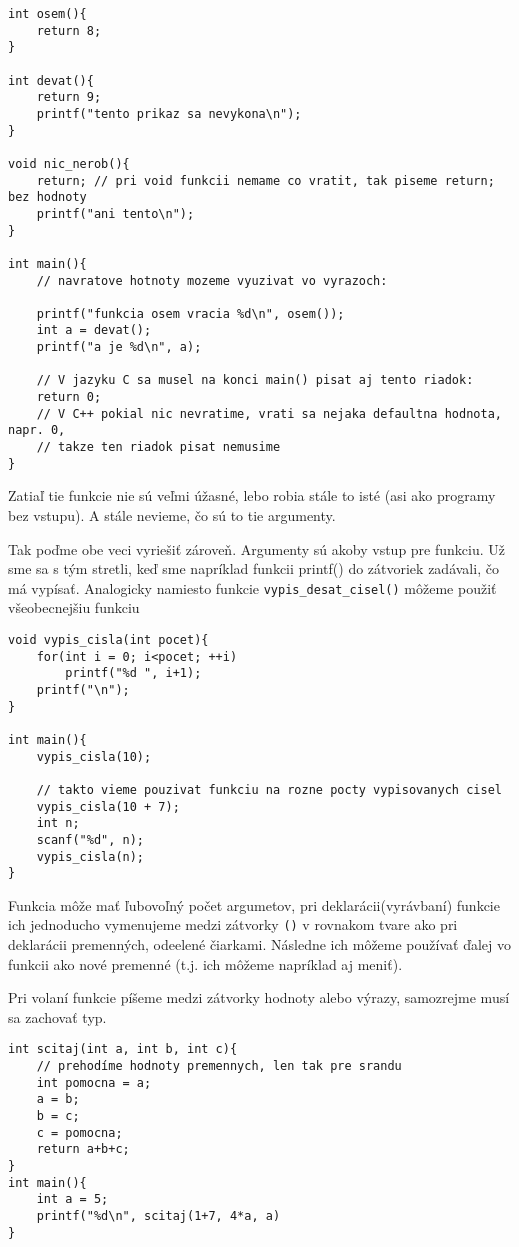 \begin{lstlisting}
int osem(){
    return 8;
}

int devat(){
    return 9;
    printf("tento prikaz sa nevykona\n");
}

void nic_nerob(){
    return; // pri void funkcii nemame co vratit, tak piseme return; bez hodnoty
    printf("ani tento\n");
}

int main(){
    // navratove hotnoty mozeme vyuzivat vo vyrazoch:

    printf("funkcia osem vracia %d\n", osem());
    int a = devat();
    printf("a je %d\n", a);

    // V jazyku C sa musel na konci main() pisat aj tento riadok:
    return 0;
    // V C++ pokial nic nevratime, vrati sa nejaka defaultna hodnota, napr. 0,
    // takze ten riadok pisat nemusime
}   
\end{lstlisting}

\medskip
    
Zatiaľ tie funkcie nie sú veľmi úžasné, lebo robia stále to isté (asi ako
programy bez vstupu).  A stále nevieme, čo sú to tie argumenty.

Tak poďme obe veci vyriešiť zároveň. Argumenty sú akoby vstup pre funkciu.  Už
sme sa s tým stretli, keď sme napríklad funkcii printf() do zátvoriek zadávali,
čo má vypísať.  Analogicky namiesto funkcie \verb!vypis_desat_cisel()! môžeme
použiť všeobecnejšiu funkciu

\begin{lstlisting}
void vypis_cisla(int pocet){
    for(int i = 0; i<pocet; ++i)
        printf("%d ", i+1);
    printf("\n"); 
}

int main(){
    vypis_cisla(10);

    // takto vieme pouzivat funkciu na rozne pocty vypisovanych cisel
    vypis_cisla(10 + 7);
    int n;
    scanf("%d", n);
    vypis_cisla(n);
}
\end{lstlisting}

Funkcia môže mať ľubovoľný počet argumetov, pri deklarácii(vyrávbaní) funkcie
ich jednoducho vymenujeme medzi zátvorky \verb!()! v rovnakom tvare ako pri
deklarácii premenných, odeelené čiarkami. Následne ich môžeme používať ďalej vo
funkcii ako nové premenné (t.j. ich môžeme napríklad aj meniť).

Pri volaní funkcie píšeme medzi zátvorky hodnoty alebo výrazy, samozrejme musí
sa zachovať typ.

\begin{lstlisting}
int scitaj(int a, int b, int c){
    // prehodíme hodnoty premennych, len tak pre srandu
    int pomocna = a;
    a = b;
    b = c;
    c = pomocna;
    return a+b+c;
}
int main(){
    int a = 5;
    printf("%d\n", scitaj(1+7, 4*a, a)
}
\end{lstlisting}

